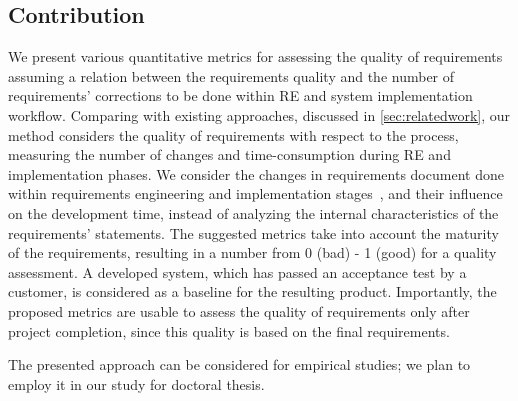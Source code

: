 \subsection{Contribution}
We present various quantitative metrics for assessing the quality of requirements assuming a relation 
between the requirements quality and the number of requirements' corrections to be done within RE and system implementation workflow. 
Comparing with existing approaches, discussed in \autoref{sec:relatedwork}, our method considers the quality of 
requirements with respect to the process, measuring the number of changes and time-consumption during RE and 
implementation phases. We consider the changes in requirements document done within 
requirements engineering and implementation stages~\cite{FARBEY:1990}, and their influence on the development time, 
instead of analyzing the internal characteristics of the requirements' statements. 
The suggested metrics take into account the maturity of the requirements, 
resulting in a number from 0 (bad) - 1 (good) for a quality assessment.  
A developed system, which has passed an acceptance test by a customer, is considered as a baseline 
for the resulting product. Importantly, the proposed metrics are usable to assess the quality of requirements 
only after project completion, since this quality is based on the final requirements.

The presented approach can be considered for empirical studies; we plan to employ it in our study 
for doctoral thesis. %
